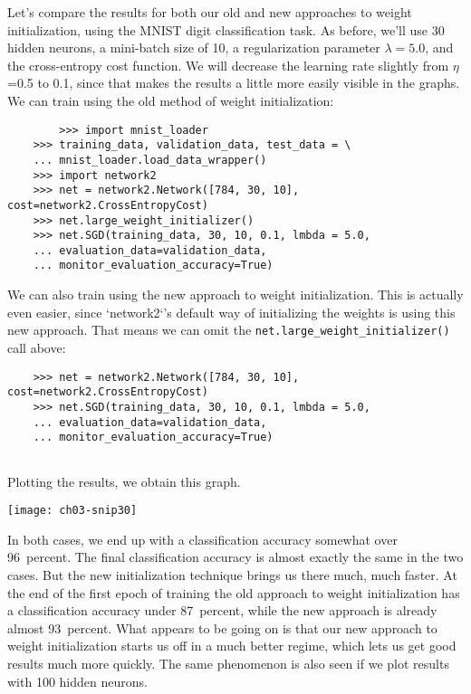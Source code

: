 Let's compare the results for both our old and new approaches to weight initialization, using the MNIST digit classification task. As before, we'll use 30 hidden neurons, a mini-batch size of 10, a regularization parameter $\lambda=5.0$, and the cross-entropy cost function. We will decrease the learning rate slightly from $\eta$=0.5 to 0.1, since that makes the results a little more easily visible in the graphs. We can train using the old method of weight initialization: 


\begin{lstlisting}
        >>> import mnist_loader
    >>> training_data, validation_data, test_data = \
    ... mnist_loader.load_data_wrapper()
    >>> import network2
    >>> net = network2.Network([784, 30, 10], cost=network2.CrossEntropyCost)
    >>> net.large_weight_initializer()
    >>> net.SGD(training_data, 30, 10, 0.1, lmbda = 5.0,
    ... evaluation_data=validation_data, 
    ... monitor_evaluation_accuracy=True)
\end{lstlisting}

We can also train using the new approach to weight initialization. This is actually even easier, since `network2`'s default way of initializing the weights is using this new approach. That means we can omit the \lstinline{net.large_weight_initializer()} call above: 

\begin{lstlisting}
    >>> net = network2.Network([784, 30, 10], cost=network2.CrossEntropyCost)
    >>> net.SGD(training_data, 30, 10, 0.1, lmbda = 5.0,
    ... evaluation_data=validation_data, 
    ... monitor_evaluation_accuracy=True)
    
\end{lstlisting}
Plotting the results, we obtain this graph.

\begin{marginfigure}
    \texttt{[image: ch03-snip30]}
    \end{marginfigure}

In both cases, we end up with a classification accuracy somewhat over 96~percent. The final classification accuracy is almost exactly the same in the two cases. But the new initialization technique brings us there much, much faster. At the end of the first epoch of training the old approach to weight initialization has a classification accuracy under 87~percent, while the new approach is already almost 93~percent. What appears to be going on is that our new approach to weight initialization starts us off in a much better regime, which lets us get good results much more quickly. The same phenomenon is also seen if we plot results with 100 hidden neurons.

